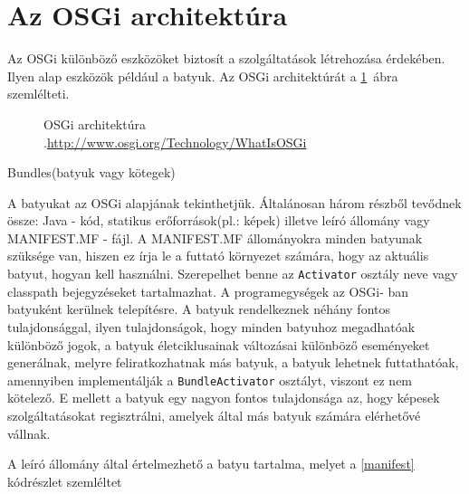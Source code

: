 \section{Az OSGi architektúra}\label{sec:OSGI_architektura}

Az OSGi különböző eszközöket biztosít a szolgáltatások létrehozása érdekében. Ilyen alap eszközök például a batyuk\cite{batyu}. Az OSGi architektúrát a \ref{fig:osgiArchitektura}~ábra szemlélteti.

\begin{figure}[t]
  \centering
  \caption[OSGi architektura]%
  {OSGi architektúra\\
  {\white .}\hfill\url{http://www.osgi.org/Technology/WhatIsOSGi}}
  \label{fig:osgiArchitektura}
\end{figure}

Bundles(batyuk vagy kötegek)

A batyukat az OSGi alapjának tekinthetjük. Általánosan három részből tevődnek össze: Java - kód, statikus erőforrások(pl.: képek) illetve leíró állomány vagy MANIFEST.MF - fájl. A MANIFEST.MF állományokra minden batyunak szüksége van, hiszen ez írja le a futtató környezet számára, hogy az aktuális batyut, hogyan kell használni. Szerepelhet benne az \texttt{Activator} osztály neve vagy classpath bejegyzéseket tartalmazhat. A programegységek az OSGi- ban batyuként kerülnek telepítésre. A batyuk rendelkeznek néhány fontos tulajdonsággal, ilyen tulajdonságok, hogy minden batyuhoz megadhatóak különböző jogok, a batyuk életciklusainak változásai különböző eseményeket generálnak, melyre feliratkozhatnak más batyuk, a batyuk lehetnek futtathatóak, amennyiben implementálják a \texttt{BundleActivator} osztályt, viszont ez nem kötelező. E mellett a batyuk egy nagyon fontos tulajdonsága az, hogy képesek szolgáltatásokat regisztrálni, amelyek által más batyuk számára elérhetővé vállnak.

A leíró állomány által értelmezhető a batyu tartalma, melyet a \ref{manifest} kódrészlet szemléltet
% 
\lstset{
  numbers=left,
  stepnumber=1,    
  firstnumber=1,
  numberfirstline=true
}

 
